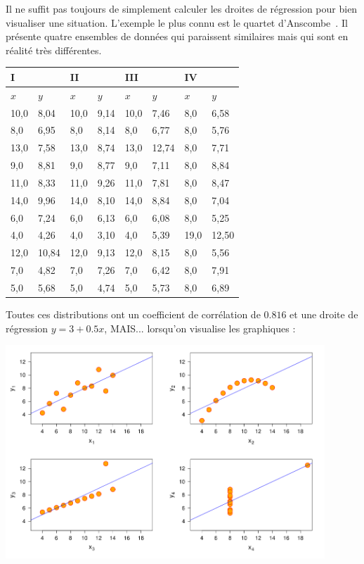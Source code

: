 \begin{remarque}
Il ne suffit pas toujours de simplement calculer les droites de régression pour bien visualiser une situation. L'exemple le plus connu est le quartet d'Anscombe~. Il présente quatre ensembles de données qui paraissent similaires mais qui sont en réalité très différentes.

\begin{center}
\begin{tabular}{|ll|ll|ll|ll|}
\hline
I    &       & II   &      & III  &       & IV   &       \\
\hline
$x$    & $y$     & $x$    & $y$    & $x$    & $y$     & $x$    & $y$     \\
10,0 & 8,04  & 10,0 & 9,14 & 10,0 & 7,46  & 8,0  & 6,58  \\
8,0  & 6,95  & 8,0  & 8,14 & 8,0  & 6,77  & 8,0  & 5,76  \\
13,0 & 7,58  & 13,0 & 8,74 & 13,0 & 12,74 & 8,0  & 7,71  \\
9,0  & 8,81  & 9,0  & 8,77 & 9,0  & 7,11  & 8,0  & 8,84  \\
11,0 & 8,33  & 11,0 & 9,26 & 11,0 & 7,81  & 8,0  & 8,47  \\
14,0 & 9,96  & 14,0 & 8,10 & 14,0 & 8,84  & 8,0  & 7,04  \\
6,0  & 7,24  & 6,0  & 6,13 & 6,0  & 6,08  & 8,0  & 5,25  \\
4,0  & 4,26  & 4,0  & 3,10 & 4,0  & 5,39  & 19,0 & 12,50 \\
12,0 & 10,84 & 12,0 & 9,13 & 12,0 & 8,15  & 8,0  & 5,56  \\
7,0  & 4,82  & 7,0  & 7,26 & 7,0  & 6,42  & 8,0  & 7,91  \\
5,0  & 5,68  & 5,0  & 4,74 & 5,0  & 5,73  & 8,0  & 6,89 \\
\hline
\end{tabular}
\end{center}

Toutes ces distributions ont un coefficient de corrélation de $0.816$ et une droite de régression $y=3 + 0.5 x$, MAIS... lorsqu'on visualise les graphiques :

\begin{center}
\includegraphics[width = 0.9\textwidth]{statistiques/image/anscombe.png}
\end{center}


\end{remarque}

